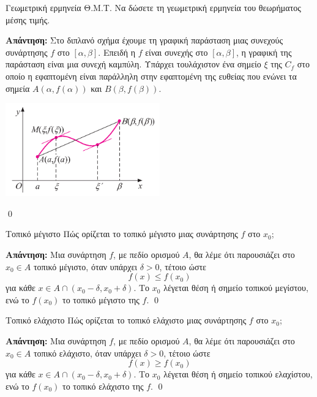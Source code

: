 \documentclass[a4paper, 12pt]{article}
\renewenvironment{proof}[1][\textbf{Απάντηση}]{%
  \par\noindent\textbf{#1:} \rmfamily}{\qed\par}
\begin{document}
\begin{theorem}{Γεωμετρική ερμηνεία Θ.Μ.Τ.}
  Να δώσετε τη γεωμετρική ερμηνεία του θεωρήματος μέσης τιμής.
\end{theorem}
\begin{proof}
  Στο διπλανό σχήμα έχουμε τη γραφική παράσταση μιας συνεχούς συνάρτησης $f$ στο $[α, β]$. Επειδή η $f$ είναι συνεχής στο $[α, β]$, η γραφική της παράσταση είναι μια συνεχή καμπύλη. Υπάρχει τουλάχιστον ένα σημείο $ξ$ της $C_f$ στο οποίο η εφαπτομένη είναι παράλληλη στην εφαπτομένη της ευθείας που ενώνει τα σημεία $A(α, f(α))$ και $B(β, f(β))$.
  \begin{center}
    \includegraphics[width=0.5\textwidth]{images/geoTMT}
  \end{center}
\end{proof}

\begin{theorem}{Τοπικό μέγιστο}
  Πώς ορίζεται το τοπικό μέγιστο μιας συνάρτησης $f$ στο $x_0$;
\end{theorem}
\begin{proof}
  Μια συνάρτηση $f$, με πεδίο ορισμού $A$, θα λέμε ότι παρουσιάζει στο $x_0 \in A$ τοπικό μέγιστο, όταν υπάρχει $δ > 0$, τέτοιο ώστε
  $$f ( x) \leq f ( x_0 )$$
  για κάθε $x \in A \cap ( x_0 − δ , x_0 + δ )$.
  Το $x_0$ λέγεται θέση ή σημείο τοπικού μεγίστου, ενώ το $f(x_0)$ το τοπικό μέγιστο της $f$.
\end{proof}

\begin{theorem}{Τοπικό ελάχιστο}
  Πώς ορίζεται το τοπικό ελάχιστο μιας συνάρτησης $f$ στο $x_0$;
\end{theorem}
\begin{proof}
  Μια συνάρτηση $f$, με πεδίο ορισμού $A$, θα λέμε ότι παρουσιάζει στο $x_0 \in A$ τοπικό ελάχιστο, όταν υπάρχει $δ > 0$, τέτοιο ώστε
  $$f ( x) \geq f ( x_0 )$$
  για κάθε $x \in A \cap ( x_0 − δ , x_0 + δ )$.
  Το $x_0$ λέγεται θέση ή σημείο τοπικού ελαχίστου, ενώ το $f(x_0)$ το τοπικό ελάχιστο της $f$.
\end{proof}
\end{document}

